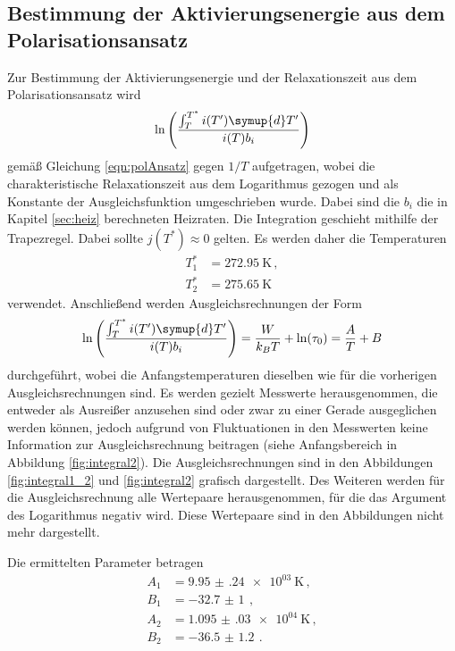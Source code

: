 \newpage
\subsection{Bestimmung der Aktivierungsenergie aus dem Polarisationsansatz}
\label{subsec:polarisation}

Zur Bestimmung der Aktivierungsenergie und der Relaxationszeit aus dem Polarisationsansatz wird
\begin{equation*}
	\ln\left(\frac{\int_T^{T^*}i(T') \symup{d}T'}{i(T) b_i}\right)
\end{equation*}
gemäß Gleichung \eqref{eqn:polAnsatz} gegen $1/T$ aufgetragen, wobei die charakteristische Relaxationszeit aus dem Logarithmus gezogen und als Konstante der Ausgleichsfunktion umgeschrieben wurde. Dabei sind die $b_i$ die in Kapitel \ref{sec:heiz}
berechneten Heizraten. Die Integration geschieht mithilfe der Trapezregel. Dabei sollte $j(T^*)\approx 0$ gelten. Es werden daher die Temperaturen
\begin{align*}
	T_1^* &=\SI{272.95}{\kelvin} \,, \\
	T_2^* &=\SI{275.65}{\kelvin}
\end{align*}
verwendet.
Anschließend werden Ausgleichsrechnungen der Form
\begin{equation*}
	\ln\left(\frac{\int_T^{T^*}i(T') \symup{d}T'}{i(T) b_i}\right) =\frac{W}{k_B T}+\ln(\tau_0)=\frac{A}{T}+B
\end{equation*}
durchgeführt, wobei die Anfangstemperaturen dieselben wie für die vorherigen Ausgleichsrechnungen sind. Es werden gezielt Messwerte herausgenommen, die entweder als Ausreißer anzusehen sind oder zwar zu einer Gerade ausgeglichen werden können, jedoch aufgrund von Fluktuationen in den Messwerten keine Information zur Ausgleichsrechnung beitragen (siehe Anfangsbereich in Abbildung \ref{fig:integral2}). Die Ausgleichsrechnungen sind in den
Abbildungen \ref{fig:integral1_2} und \ref{fig:integral2} grafisch dargestellt.
Des Weiteren werden für die Ausgleichsrechnung alle Wertepaare herausgenommen, für die das Argument des Logarithmus negativ wird. Diese Wertepaare sind in den Abbildungen nicht mehr dargestellt.

Die ermittelten Parameter betragen
\begin{align*}
  A_1&=\SI{9.95(24)e+03}{\kelvin} \,, \\
  B_1&=\SI{-32.7(10)}{}  \,, \\
  A_2&=\SI{1.095(030)e+04}{\kelvin} \,, \\
  B_2&=\SI{-36.5(12)}{}  \,.
\end{align*}

